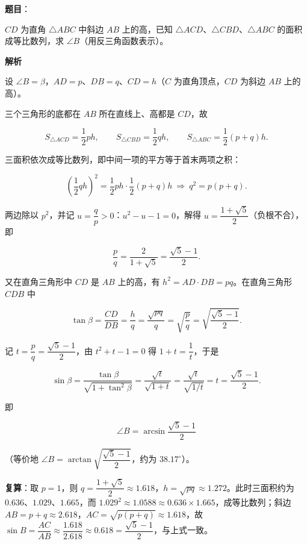 \begin{answer}

\textbf{题目}：

$CD$ 为直角 $\triangle ABC$ 中斜边 $AB$ 上的高，已知 $\triangle ACD$、$\triangle CBD$、$\triangle ABC$ 的面积成等比数列，求 $\angle B$（用反三角函数表示）。

\textbf{解析}

设 $\angle B=\beta$，$AD=p$、$DB=q$、$CD=h$（$C$ 为直角顶点，$CD$ 为斜边 $AB$ 上的高）。

三个三角形的底都在 $AB$ 所在直线上、高都是 $CD$，故

\nopagebreak[4]
\[
S_{\triangle ACD}=\frac12ph,\qquad S_{\triangle CBD}=\frac12qh,\qquad S_{\triangle ABC}=\frac12(p+q)h.
\]

三面积依次成等比数列，即中间一项的平方等于首末两项之积：

\nopagebreak[4]
\[
\left(\frac12qh\right)^2=\frac12ph\cdot\frac12(p+q)h
\ \Longrightarrow\ q^2=p(p+q).
\]

两边除以 $p^2$，并记 $u=\dfrac qp>0$：$u^2-u-1=0$，解得 $u=\dfrac{1+\sqrt5}{2}$（负根不合），即

\nopagebreak[4]
\[
\frac pq=\frac{2}{1+\sqrt5}=\frac{\sqrt5-1}{2}.
\]

又在直角三角形中 $CD$ 是 $AB$ 上的高，有 $h^2=AD\cdot DB=pq$。在直角三角形 $CDB$ 中

\nopagebreak[4]
\[
\tan\beta=\frac{CD}{DB}=\frac hq=\frac{\sqrt{pq}}{q}=\sqrt{\frac pq}=\sqrt{\frac{\sqrt5-1}{2}}.
\]

记 $t=\dfrac pq=\dfrac{\sqrt5-1}{2}$，由 $t^2+t-1=0$ 得 $1+t=\dfrac1t$，于是

\nopagebreak[4]
\[
\sin\beta=\frac{\tan\beta}{\sqrt{1+\tan^2\beta}}=\frac{\sqrt t}{\sqrt{1+t}}=\frac{\sqrt t}{\sqrt{1/t}}=t=\frac{\sqrt5-1}{2}.
\]

即

\nopagebreak[4]
\[
\angle B=\arcsin\frac{\sqrt5-1}{2}
\]

（等价地 $\angle B=\arctan\sqrt{\dfrac{\sqrt5-1}{2}}$，约为 $38.17^\circ$）。

\textbf{复算}：取 $p=1$，则 $q=\dfrac{1+\sqrt5}{2}\approx1.618$，$h=\sqrt{pq}\approx1.272$。此时三面积约为 $0.636$、$1.029$、$1.665$，而 $1.029^2\approx1.0588\approx0.636\times1.665$，成等比数列；斜边 $AB=p+q\approx2.618$，$AC=\sqrt{p(p+q)}\approx1.618$，故 $\sin B=\dfrac{AC}{AB}\approx\dfrac{1.618}{2.618}\approx0.618=\dfrac{\sqrt5-1}{2}$，与上式一致。


\end{answer}
